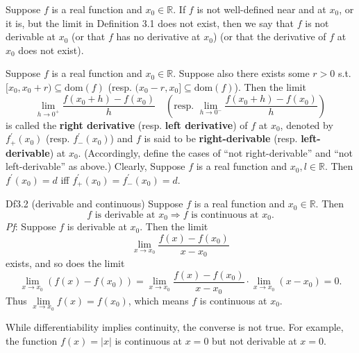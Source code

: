 \documentclass{article}
\begin{document}
\begin{Rmk}{}
    \begin{compactenum}
        \item \textcolor{Df}{Suppose $f$ is a real function and $x_0\in\mathbb{R}$. If $f$ is not well-defined near and at $x_0$, or it is, but the limit in Definition 3.1 does not exist, then we say that $f$ is not derivable at $x_0$ (or that $f$ has no derivative at $x_0$) (or that the derivative of $f$ at $x_0$ does not exist).}
        \item \textcolor{Df}{Suppose $f$ is a real function and $x_0\in\mathbb{R}$. Suppose also there exists some $r>0$ s.t. $[x_0, x_0+r)\subseteq \text{dom}(f)$ (resp. $(x_0-r, x_0]\subseteq \text{dom}(f)$). Then the limit 
        $$ \lim_{h\to 0^+} \frac{f(x_0+h)-f(x_0)}{h}\quad \left(\text{resp. } \lim_{h\to 0^-} \frac{f(x_0+h)-f(x_0)}{h}\right) $$
        is called the \textbf{right derivative} (resp. \textbf{left derivative}) of $f$ at $x_0$, denoted by $f_+^\prime (x_0)$ (resp. $f_-^\prime (x_0)$) and $f$ is said to be \textbf{right-derivable} (resp. \textbf{left-derivable}) at $x_0$. (Accordingly, define the cases of ``not right-derivable'' and ``not left-derivable'' as above.)} Clearly, \textcolor{Th}{Suppose $f$ is a real function and $x_0, l\in\mathbb{R}$. Then $f^\prime(x_0) = d$ iff $f_+^\prime(x_0) = f_-^\prime(x_0) = d$.}
    \end{compactenum}
\end{Rmk}

\begin{Th}{Df3.2 (derivable and continuous)}
    Suppose $f$ is a real function and $x_0\in\mathbb{R}$. Then 
    $$ f \text{ is derivable at } x_0 \Rightarrow f \text{ is continuous at } x_0. $$
    \tcblower
    \textit{Pf}: Suppose $f$ is derivable at $x_0$. Then the limit
    $$ \lim_{x\to x_0} \frac{f(x)-f(x_0)}{x-x_0} $$
    exists, and so does the limit 
    $$\lim\limits_{x\to x_0} (f(x)-f(x_0)) = \lim\limits_{x\to x_0} \frac{f(x)-f(x_0)}{x-x_0}\cdot \lim\limits_{x\to x_0} (x-x_0) = 0.$$ 
    Thus $\lim\limits_{x\to x_0} f(x) = f(x_0)$, which means $f$ is continuous at $x_0$. 
\end{Th}

\begin{Rmk}{}
    \textcolor{Th}{While differentiability implies continuity, the converse is not true. For example, the function $f(x) = |x|$ is continuous at $x=0$ but not derivable at $x=0$.}
\end{Rmk}
\end{document}
